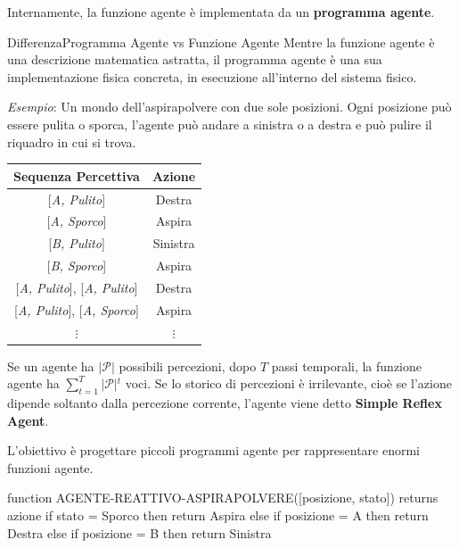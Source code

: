 \documentclass[a4paper, 11pt, oneside]{book}
\theoremstyle{definition}
\begin{document}
	Internamente, la funzione agente \`e implementata da un \textbf{programma
	agente}.
	\begin{nota}
		{Differenza}{Programma Agente vs Funzione Agente} Mentre la funzione agente
		\`e una descrizione matematica astratta, il programma agente \`e una sua
		implementazione fisica concreta, in esecuzione all'interno del sistema fisico.
	\end{nota}
	\emph{Esempio}: Un mondo dell'aspirapolvere con due sole posizioni. Ogni posizione
	pu\`o essere pulita o sporca, l'agente pu\`o andare a sinistra o a destra e pu\`o
	pulire il riquadro in cui si trova.
	\begin{center}
		\begin{tabular}{ |c|c| }
			\hline
			Sequenza Percettiva                      & Azione   \\
			\hline
			{}[\emph{A, Pulito}]                     & Destra   \\
			{}[\emph{A, Sporco}]                     & Aspira   \\
			{}[\emph{B, Pulito}]                     & Sinistra \\
			{}[\emph{B, Sporco}]                     & Aspira   \\
			{}[\emph{A, Pulito}], [\emph{A, Pulito}] & Destra   \\
			{}[\emph{A, Pulito}], [\emph{A, Sporco}] & Aspira   \\
			$\vdots$                                 & $\vdots$ \\
			\hline
		\end{tabular}
	\end{center}
	\vspace{1em}
	Se un agente ha $\vert{}\mathcal{P}\vert{}$ possibili percezioni, dopo $T$
	passi temporali, la funzione agente ha $\sum_{t=1}^{T}\vert{}\mathcal{P}\vert{}
	^{t}$ voci. Se lo storico di percezioni \`e irrilevante, cio\`e se l'azione
	dipende soltanto dalla percezione corrente, l'agente viene detto \textbf{Simple
	Reflex Agent}.

	L'obiettivo \`e progettare piccoli programmi agente per rappresentare enormi funzioni
	agente.

\begin{codice}
function AGENTE-REATTIVO-ASPIRAPOLVERE([posizione, stato]) returns azione
    if stato = Sporco then return Aspira
    else if posizione = A then return Destra
    else if posizione = B then return Sinistra
\end{codice}
\end{document}
